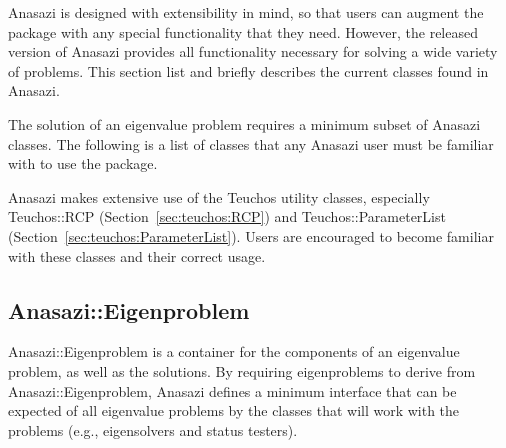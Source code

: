 Anasazi is designed with extensibility in mind, so that users can augment the package with
any special functionality that they need. However, the released version of Anasazi
provides all functionality necessary for solving a wide variety of problems. This section
list and briefly describes the current classes found in Anasazi.

The solution of an eigenvalue problem requires a minimum subset of Anasazi classes. The
following is a list of classes that any Anasazi user must be familiar with to use the
package.

\begin{remark}
Anasazi makes extensive use of the Teuchos utility classes, especially
Teuchos::RCP (Section~\ref{sec:teuchos:RCP}) and
Teuchos::ParameterList (Section~\ref{sec:teuchos:ParameterList}). Users
are encouraged to become familiar with these classes and their correct
usage.
\end{remark}

\subsection{Anasazi::Eigenproblem}
\label{sec:anasazi:eigenproblem}

Anasazi::Eigenproblem is a container for the components of an eigenvalue problem, as well
as the solutions. By requiring eigenproblems to derive from Anasazi::Eigenproblem, Anasazi
defines a minimum interface that can be expected of all eigenvalue problems by the classes
that will work with the problems (e.g., eigensolvers and status testers).

